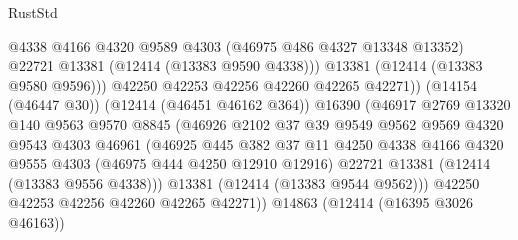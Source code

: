 \begin{lexlean}{RustStd}
\begin{coremodule}
                                    @4338
                                    @4166
                                    @4320
                                    @9589
                                    @4303
                                    (@46975 @486 @4327 @13348 @13352)
                                    @22721
                                    @13381
                                    (@12414 (@13383 @9590 @4338)))
                                  @13381
                                  (@12414 (@13383 @9580 @9596)))
                                @42250
                                @42253
                                @42256
                                @42260
                                @42265
                                @42271))
                            (@14154 (@46447 @30))
                            (@12414 (@46451 @46162 @364))
                            @16390
                            (@46917
                              @2769
                              @13320
                              @140
                              @9563
                              @9570
                              @8845
                              (@46926
                                @2102
                                @37
                                @39
                                @9549
                                @9562
                                @9569
                                @4320
                                @9543
                                @4303
                                @46961
                                (@46925
                                  @445
                                  @382
                                  @37
                                  @11
                                  @4250
                                  @4338
                                  @4166
                                  @4320
                                  @9555
                                  @4303
                                  (@46975 @444 @4250 @12910 @12916)
                                  @22721
                                  @13381
                                  (@12414 (@13383 @9556 @4338)))
                                @13381
                                (@12414 (@13383 @9544 @9562)))
                              @42250
                              @42253
                              @42256
                              @42260
                              @42265
                              @42271))
                          @14863
                          (@12414 (@16395 @3026 @46163))

\end{coremodule}
\end{lexlean}
